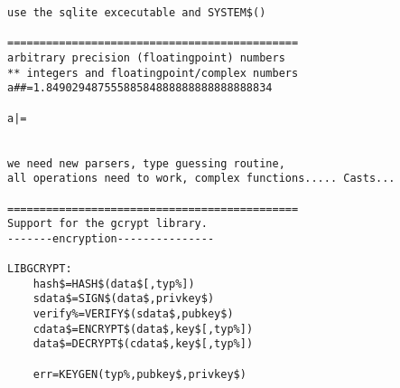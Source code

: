 \begin{verbatim}
use the sqlite excecutable and SYSTEM$()

=============================================
arbitrary precision (floatingpoint) numbers
** integers and floatingpoint/complex numbers
a##=1.84902948755588584888888888888888834

a|=


we need new parsers, type guessing routine,
all operations need to work, complex functions..... Casts...

=============================================
Support for the gcrypt library.
-------encryption---------------

LIBGCRYPT:
    hash$=HASH$(data$[,typ%])
    sdata$=SIGN$(data$,privkey$)
    verify%=VERIFY$(sdata$,pubkey$)
    cdata$=ENCRYPT$(data$,key$[,typ%])
    data$=DECRYPT$(cdata$,key$[,typ%])

    err=KEYGEN(typ%,pubkey$,privkey$)


\end{verbatim}
